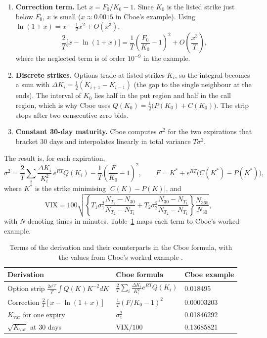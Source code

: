 \documentclass[12pt]{article}
\newcommand{\Kvar}{K_{\mathrm{var}}}
\newcommand{\VIX}{\mathrm{VIX}}
\begin{document}
\begin{enumerate}
  \item \textbf{Correction term.} Let $x=F_0/K_0-1$. Since $K_0$ is the listed strike just below $F_0$, $x$ is small ($x\approx 0.0015$ in Cboe's example). Using $\ln(1+x)=x-\tfrac{1}{2}x^2+O(x^3)$,
  \begin{equation}
    \frac{2}{T}\bigl[x-\ln(1+x)\bigr] = \frac{1}{T}\left(\frac{F_0}{K_0}-1\right)^2 + O\!\left(\frac{x^3}{T}\right),
  \end{equation}
  where the neglected term is of order $10^{-9}$ in the example.
  \item \textbf{Discrete strikes.} Options trade at listed strikes $K_i$, so the integral becomes a sum with $\Delta K_i=\tfrac{1}{2}(K_{i+1}-K_{i-1})$ (the gap to the single neighbour at the ends). The interval of $K_0$ lies half in the put region and half in the call region, which is why Cboe uses $Q(K_0)=\tfrac{1}{2}\bigl(P(K_0)+C(K_0)\bigr)$. The strip stops after two consecutive zero bids.
  \item \textbf{Constant 30-day maturity.} Cboe computes $\sigma^2$ for the two expirations that bracket 30 days and interpolates linearly in total variance $T\sigma^2$.
\end{enumerate}
The result is, for each expiration,
\begin{equation}
  \sigma^2 = \frac{2}{T}\sum_i \frac{\Delta K_i}{K_i^2}\,e^{RT}Q(K_i) - \frac{1}{T}\left(\frac{F}{K_0}-1\right)^2,
  \qquad F = K^* + e^{RT}\bigl(C(K^*)-P(K^*)\bigr),
  \label{eq:cboe}
\end{equation}
where $K^*$ is the strike minimising $|C(K)-P(K)|$, and
\begin{equation}
  \VIX = 100\sqrt{\left\{T_1\sigma_1^2\frac{N_{T_2}-N_{30}}{N_{T_2}-N_{T_1}} + T_2\sigma_2^2\frac{N_{30}-N_{T_1}}{N_{T_2}-N_{T_1}}\right\}\frac{N_{365}}{N_{30}}},
  \label{eq:interp}
\end{equation}
with $N$ denoting times in minutes. Table~\ref{tab:map} maps each term to Cboe's worked example.

\begin{table}[H]
\centering
\small
\begin{tabular}{@{}lll@{}}
\toprule
\textbf{Derivation} & \textbf{Cboe formula} & \textbf{Cboe example}\\
\midrule
Option strip $\frac{2e^{rT}}{T}\int Q(K)K^{-2}dK$ & $\frac{2}{T}\sum_i \frac{\Delta K_i}{K_i^2}e^{RT}Q(K_i)$ & 0.018495\\[3pt]
Correction $\frac{2}{T}[x-\ln(1+x)]$ & $\frac{1}{T}(F/K_0-1)^2$ & 0.00003203\\[3pt]
$\Kvar$ for one expiry & $\sigma_1^2$ & 0.01846292\\[3pt]
$\sqrt{\Kvar}$ at 30 days & $\VIX/100$ & 0.13685821\\
\bottomrule
\end{tabular}
\caption{Terms of the derivation and their counterparts in the Cboe formula, with the values from Cboe's worked example \cite{cboewp}.}
\label{tab:map}
\end{table}
\end{document}
